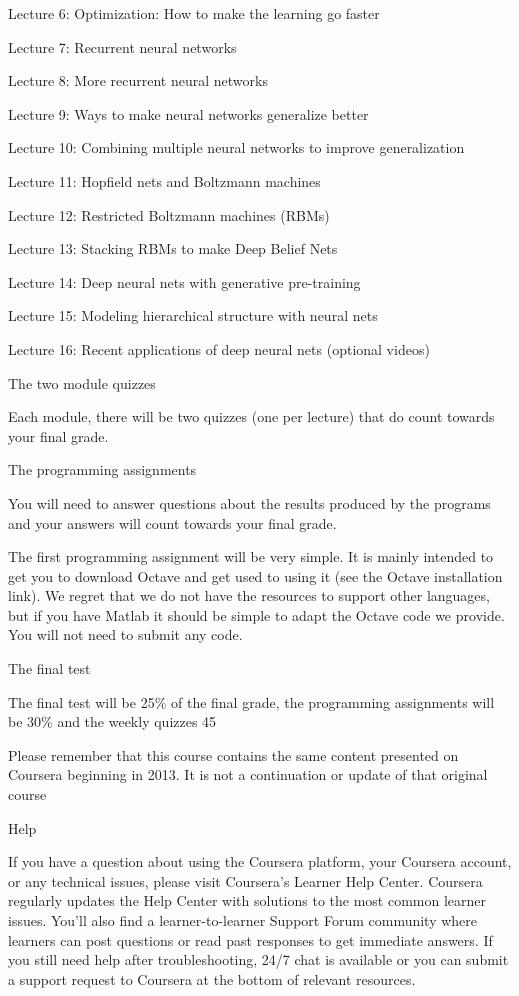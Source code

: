 Lecture 6: Optimization: How to make the learning go faster

Lecture 7: Recurrent neural networks

Lecture 8: More recurrent neural networks

Lecture 9: Ways to make neural networks generalize better

Lecture 10: Combining multiple neural networks to improve generalization

Lecture 11: Hopfield nets and Boltzmann machines

Lecture 12: Restricted Boltzmann machines (RBMs)

Lecture 13: Stacking RBMs to make Deep Belief Nets

Lecture 14: Deep neural nets with generative pre-training

Lecture 15: Modeling hierarchical structure with neural nets

Lecture 16: Recent applications of deep neural nets (optional videos)

The two module quizzes

Each module, there will be two quizzes (one per lecture) that do count towards your final grade.

The programming assignments

You will need to answer questions about the results produced by the programs and your answers will count towards your final grade.

The first programming assignment will be very simple. It is mainly intended to get you to download Octave and get used to using it (see the Octave installation link). We regret that we do not have the resources to support other languages, but if you have Matlab it should be simple to adapt the Octave code we provide. You will not need to submit any code.

The final test

The final test will be 25\% of the final grade, the programming assignments will be 30\% and the weekly quizzes 45%

Please remember that this course contains the same content presented on Coursera beginning in 2013. It is not a continuation or update of that original course

Help

If you have a question about using the Coursera platform, your Coursera account, or any technical issues, please visit Coursera's Learner Help Center. Coursera regularly updates the Help Center with solutions to the most common learner issues. You'll also find a learner-to-learner Support Forum community where learners can post questions or read past responses to get immediate answers. If you still need help after troubleshooting, 24/7 chat is available or you can submit a support request to Coursera at the bottom of relevant resources.


\subsection{}
